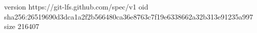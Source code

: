 version https://git-lfs.github.com/spec/v1
oid sha256:26519690d3dca1a2f2b566480ca36e8763c7f19e6338662a32b313e91235a997
size 216407

